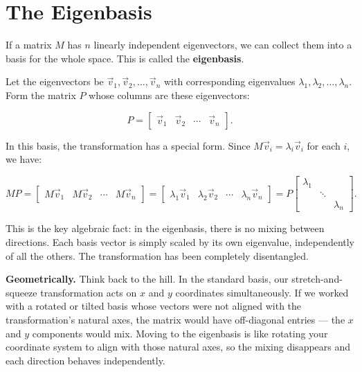 \documentclass[11pt,openany]{book}
\theoremstyle{definition}
\begin{document}
\section{The Eigenbasis}

If a matrix $M$ has $n$ linearly independent eigenvectors, we can collect them into 
a basis for the whole space. This is called the \textbf{eigenbasis}.

\medskip

Let the eigenvectors be $\vec{v}_1, \vec{v}_2, \ldots, \vec{v}_n$ with corresponding 
eigenvalues $\lambda_1, \lambda_2, \ldots, \lambda_n$. Form the matrix $P$ whose 
columns are these eigenvectors:

\[
P = \begin{bmatrix} \vec{v}_1 & \vec{v}_2 & \cdots & \vec{v}_n \end{bmatrix}.
\]

In this basis, the transformation has a special form. Since $M\vec{v}_i = \lambda_i 
\vec{v}_i$ for each $i$, we have:

\[
MP = \begin{bmatrix} M\vec{v}_1 & M\vec{v}_2 & \cdots & M\vec{v}_n \end{bmatrix}
  = \begin{bmatrix} \lambda_1\vec{v}_1 & \lambda_2\vec{v}_2 & \cdots & \lambda_n\vec{v}_n \end{bmatrix}
  = P \begin{bmatrix} \lambda_1 & & \\ & \ddots & \\ & & \lambda_n \end{bmatrix}.
\]

\medskip

This is the key algebraic fact: in the eigenbasis, there is no mixing between 
directions. Each basis vector is simply scaled by its own eigenvalue, independently 
of all the others. The transformation has been completely disentangled.

\medskip

\textbf{Geometrically.} Think back to the hill. In the standard basis, our 
stretch-and-squeeze transformation acts on $x$ and $y$ coordinates simultaneously. 
If we worked with a rotated or tilted basis whose vectors were not aligned with the 
transformation's natural axes, the matrix would have off-diagonal entries --- 
the $x$ and $y$ components would mix. Moving to the eigenbasis is like rotating 
your coordinate system to align with those natural axes, so the mixing disappears 
and each direction behaves independently.
\end{document}
